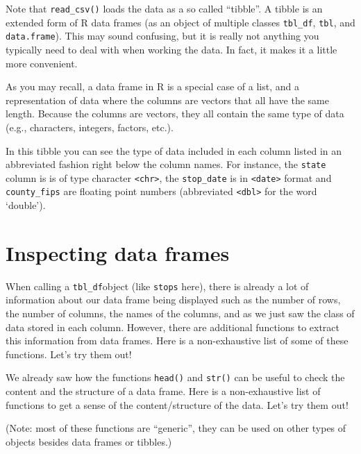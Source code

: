 \documentclass[
]{book}
\begin{document}
Note that \texttt{read\_csv()} loads the data as a so called ``tibble''. A tibble is an extended form of R data frames (as an object of multiple classes \texttt{tbl\_df}, \texttt{tbl}, and \texttt{data.frame}). This may sound confusing, but it is really not anything you typically need to deal with when working the data. In fact, it makes it a little more convenient.

As you may recall, a data frame in R is a special case of a list, and a representation of data where the columns are vectors that all have the same length. Because the columns are vectors, they all contain the same type of data (e.g., characters, integers, factors, etc.).

In this tibble you can see the type of data included in each column listed in an abbreviated fashion right below the column names. For instance, the \texttt{state} column is is of type character \texttt{\textless{}chr\textgreater{}}, the \texttt{stop\_date} is in \texttt{\textless{}date\textgreater{}} format and \texttt{county\_fips} are floating point numbers (abbreviated \texttt{\textless{}dbl\textgreater{}} for the word `double').

\section{Inspecting data frames}\label{inspecting-data-frames}

When calling a \texttt{tbl\_df}object (like \texttt{stops} here), there is already a lot of information about our data frame being displayed such as the number of rows, the number of columns, the names of the columns, and as we just saw the class of data stored in each column. However, there are additional functions to extract this information from data frames. Here is a non-exhaustive list of some of these functions. Let's try them out!

We already saw how the functions \texttt{head()} and \texttt{str()} can be useful to check the
content and the structure of a data frame. Here is a non-exhaustive list of
functions to get a sense of the content/structure of the data. Let's try them out!

(Note: most of these functions are ``generic'', they can be used on other types of
objects besides data frames or tibbles.)
\end{document}
